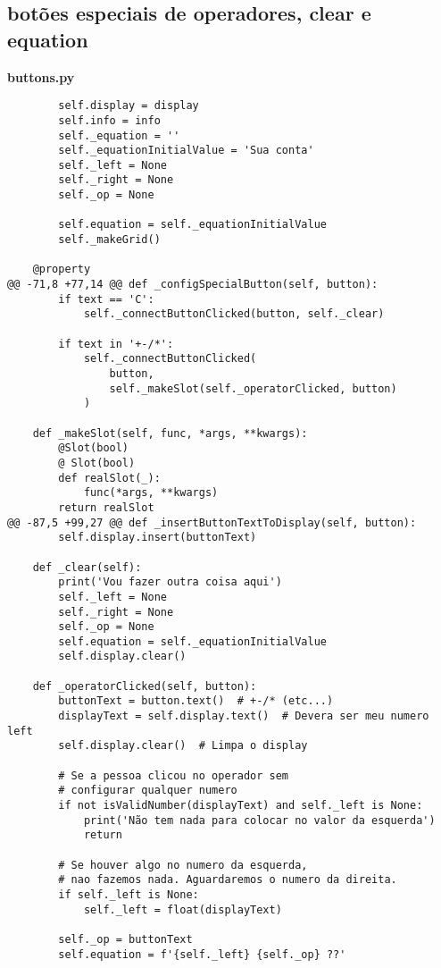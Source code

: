 \documentclass[12pt,a4paper]{article}
\begin{document}
\subsection{ botões especiais de operadores, clear e equation}
    \textbf{buttons.py}
    \begin{lstlisting}
        self.display = display
        self.info = info
        self._equation = ''
        self._equationInitialValue = 'Sua conta'
        self._left = None
        self._right = None
        self._op = None

        self.equation = self._equationInitialValue
        self._makeGrid()

    @property
@@ -71,8 +77,14 @@ def _configSpecialButton(self, button):
        if text == 'C':
            self._connectButtonClicked(button, self._clear)

        if text in '+-/*':
            self._connectButtonClicked(
                button,
                self._makeSlot(self._operatorClicked, button)
            )

    def _makeSlot(self, func, *args, **kwargs):
        @Slot(bool)
        @ Slot(bool)
        def realSlot(_):
            func(*args, **kwargs)
        return realSlot
@@ -87,5 +99,27 @@ def _insertButtonTextToDisplay(self, button):
        self.display.insert(buttonText)

    def _clear(self):
        print('Vou fazer outra coisa aqui')
        self._left = None
        self._right = None
        self._op = None
        self.equation = self._equationInitialValue
        self.display.clear()

    def _operatorClicked(self, button):
        buttonText = button.text()  # +-/* (etc...)
        displayText = self.display.text()  # Devera ser meu numero left
        self.display.clear()  # Limpa o display

        # Se a pessoa clicou no operador sem
        # configurar qualquer numero
        if not isValidNumber(displayText) and self._left is None:
            print('Não tem nada para colocar no valor da esquerda')
            return

        # Se houver algo no numero da esquerda,
        # nao fazemos nada. Aguardaremos o numero da direita.
        if self._left is None:
            self._left = float(displayText)

        self._op = buttonText
        self.equation = f'{self._left} {self._op} ??'
    \end{lstlisting}
\end{document}
